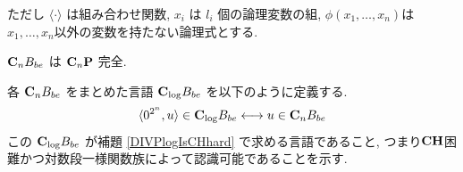 ただし $\langle \cdot \rangle$ は組み合わせ関数,
$x_i$ は $l_i$ 個の論理変数の組,
$\phi(x_1, \dots, x_n)$は$x_1, \dots, x_n$以外の変数を持たない論理式とする.


\begin{lemma} \label{lemma:CnP-complete}
 $\mathbf{C}_n B_{be}$ は $\mathbf{C}_n\mathbf{P}$ 完全.
\end{lemma}


各 $\mathbf{C}_n B_{be}$ をまとめた言語 $\mathbf{C}_{\log} B_{be}$ を以下のように定義する.
\begin{equation}
 \langle 0^{2^n}, u \rangle \in \mathbf{C}_{\log} B_{be}
 \longleftrightarrow
 u \in \mathbf{C}_n B_{be}
\end{equation}
この $\mathbf{C}_{\log} B_{be}$ が補題 \ref{DIVPlogIsCHhard} で求める言語であること,
つまり$\mathbf{CH}$困難かつ対数段一様関数族によって認識可能であることを示す.


